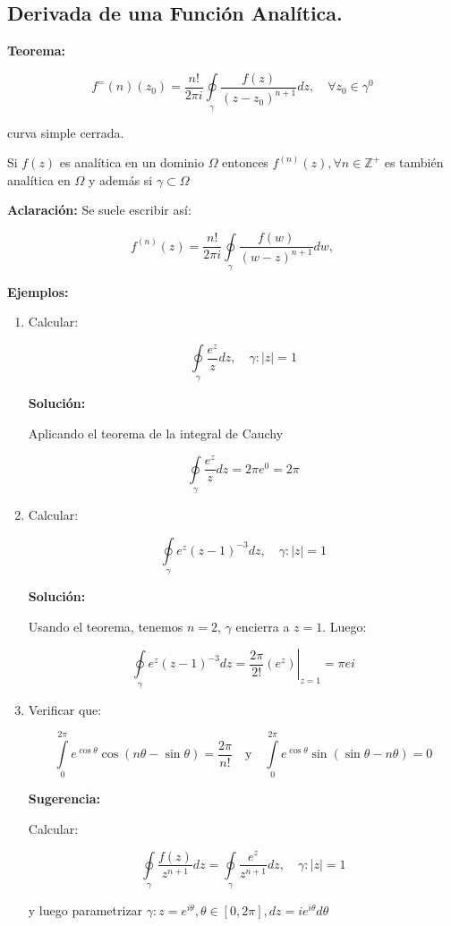 \documentclass[a4paper,12pt]{article}
\begin{document}
\subsection{Derivada de una Función Analítica.}

\textbf{Teorema:}

\[
f^={(n)}(z_0) = \frac{n!}{2\pi i} \oint\limits_{\gamma} \frac{f(z)}{(z - z_0)^{n+1}} dz, \quad \forall z_0 \in \gamma^0
\]

curva simple cerrada.

Si $f(z)$ es analítica en un dominio $\Omega$ entonces $f^{(n)}(z), \forall n \in \mathbb{Z}^+$ es también analítica en $\Omega$ y además si $\gamma \subset \Omega$

\textbf{Aclaración:} Se suele escribir así:

\[
f^{(n)}(z) = \frac{n!}{2\pi i} \oint\limits_{\gamma} \frac{f(w)}{(w - z)^{n+1}} dw,
\]

\textbf{Ejemplos:}

\begin{enumerate}
    \item Calcular:

\[
\oint\limits_{\gamma} \frac{e^z}{z} dz, \quad \gamma : |z| = 1
\]

\textbf{Solución:}

Aplicando el teorema de la integral de Cauchy

\[
\oint\limits_{\gamma} \frac{e^z}{z} dz = 2\pi e^0 = 2\pi
\]

\item Calcular:

\[
\oint\limits_{\gamma} e^z (z-1)^{-3} dz, \quad \gamma : |z| = 1
\]

\textbf{Solución:}

Usando el teorema, tenemos $n=2$, $\gamma$ encierra a $z=1$. Luego:

\[
\oint\limits_{\gamma} e^z (z-1)^{-3} dz = \left. \frac{2\pi}{2!} (e^z) \right|_{z=1} = \pi ei
\]

\item Verificar que:

\[
\int\limits_{0}^{2\pi} e^{\cos \theta} \cos(n\theta - \sin \theta) = \frac{2\pi}{n!} \quad \text{y} \quad \int\limits_{0}^{2\pi} e^{\cos \theta} \sin(\sin \theta - n\theta) = 0
\]

\textbf{Sugerencia:}

Calcular:

\[
\oint\limits_{\gamma} \frac{f(z)}{z^{n+1}} dz = \oint\limits_{\gamma} \frac{e^z}{z^{n+1}} dz, \quad \gamma : |z| = 1
\]

y luego parametrizar $\gamma : z = e^{i\theta}, \theta \in [0, 2\pi], dz = ie^{i\theta} d\theta$
\end{enumerate}
\end{document}
